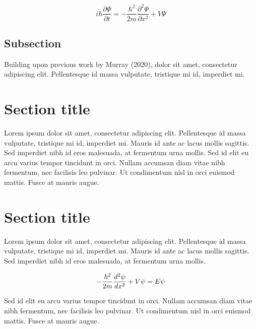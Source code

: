 \documentclass[
]{hdsr}
\begin{document}
\[
    i\hbar \frac{\partial \Psi}{\partial t} = -\frac{\hbar^2}{2m}\frac{\partial^2 \Psi}{\partial x^2} + V \Psi
\]

\hypertarget{subsection}{%
\subsection{Subsection}\label{subsection}}

Building upon previous work by Murray (2020), dolor sit amet,
consectetur adipiscing elit. Pellentesque id massa vulputate, tristique
mi id, imperdiet mi.

\hypertarget{section-title}{%
\section{Section title}\label{section-title}}

Lorem ipsum dolor sit amet, consectetur adipiscing elit. Pellentesque id
massa vulputate, tristique mi id, imperdiet mi. Mauris id ante ac lacus
mollis sagittis. Sed imperdiet nibh id eros malesuada, at fermentum urna
mollis. Sed id elit eu arcu varius tempor tincidunt in orci. Nullam
accumsan diam vitae nibh fermentum, nec facilisis leo pulvinar. Ut
condimentum nisl in orci euismod mattis. Fusce at mauris augue.

\hypertarget{section-title-1}{%
\section{Section title}\label{section-title-1}}

Lorem ipsum dolor sit amet, consectetur adipiscing elit. Pellentesque id
massa vulputate, tristique mi id, imperdiet mi. Mauris id ante ac lacus
mollis sagittis. Sed imperdiet nibh id eros malesuada, at fermentum urna
mollis.

\[
-\frac{\hbar^2}{2m} \frac{d^2 \psi}{dx^2} + V\psi = E\psi\\
\]

Sed id elit eu arcu varius tempor tincidunt in orci. Nullam accumsan
diam vitae nibh fermentum, nec facilisis leo pulvinar. Ut condimentum
nisl in orci euismod mattis. Fusce at mauris augue.
\end{document}
